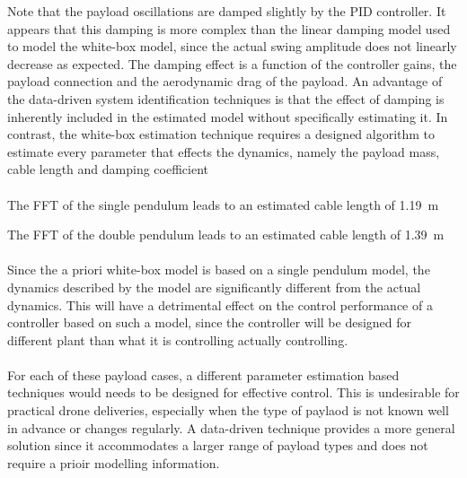         Note that the payload oscillations are damped slightly by the PID controller.
        It appears that this damping is more complex than the linear damping model 
        used to model the white-box model, since the actual swing amplitude 
        does not linearly decrease as expected.
        The damping effect is a function of the controller gains, 
        the payload connection and the aerodynamic drag of the payload.
        An advantage of the data-driven system identification techniques 
        is that the effect of damping is inherently included in the estimated model 
        without specifically estimating it.
        In contrast, the white-box estimation technique requires a designed algorithm 
        to estimate every parameter that effects the dynamics, 
        namely the payload mass, cable length and damping coefficient


        \paragraph{}
        
        
        
        
        
        
        
        The FFT of the single pendulum leads to an estimated cable length of \SI{1.19}{\metre}        

        
        The FFT of the double pendulum leads to an estimated cable length of \SI{1.39}{\metre}
        
        \paragraph{}
        Since the a priori white-box model is based on a single pendulum model, 
        the dynamics described by the model are significantly different from the actual dynamics.
        This will have a detrimental effect on the control performance of a controller based on such a model,
        since the controller will be designed for different plant than what it is controlling actually controlling.
        
        

        \paragraph{}
        For each of these payload cases, a different parameter estimation based techniques would needs to be designed for effective control.
        This is undesirable for practical drone deliveries, especially when the type of paylaod is not known well in advance or changes regularly.
        A data-driven technique provides a more general solution since it accommodates a larger range of payload types and does not require a prioir modelling information.
        
